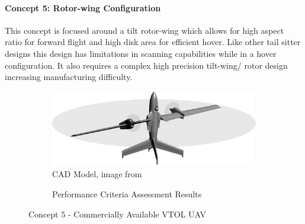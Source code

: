 \paragraph{Concept 5: Rotor-wing Configuration}

This concept is focused around a tilt rotor-wing which allows for high aspect ratio for forward flight and high disk area for efficient hover. Like other tail sitter designs this design has limitations in scanning capabilities while in a hover configuration. It also requires a complex high precision tilt-wing/ rotor design increasing manufacturing difficulty. 


\begin{figure}[H]
\centering
\begin{subfigure}[t]{.5\textwidth}
  \centering
  \includegraphics[width=0.9\linewidth]{Concepts/rotorwing.png}
  \vspace{0.125cm}
  \caption{CAD Model, image from }
  \label{fig:cad1}
\end{subfigure}%
\begin{subfigure}[t]{.5\textwidth}
  \centering
  \caption{Performance Criteria Assessment Results}
  \label{fig:radar1}
\end{subfigure}
\caption{Concept 5 - Commercially Available VTOL UAV}
\label{fig:concept2}
\end{figure}

